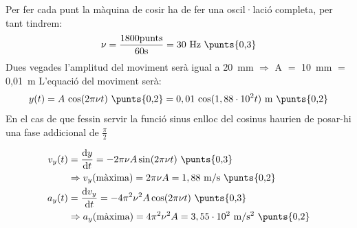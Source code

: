 \begin{solapartat}
Per fer cada punt la màquina de cosir ha de fer una oscil·lació completa, per tant tindrem:
\[ \nu = \frac{1800\text{punts}}{60\mathrm{s}} = 30\ \mathrm{Hz} \ \text{\punts{0,3}} \]
Dues vegades l'amplitud del moviment serà igual a 20~mm $\Rightarrow$ A $=$ 10~mm $=$ 0,01~m  L'equació del moviment serà:
\[ y(t) = A\,\cos(2\pi\nu t) \ \text{\punts{0,2}} = 0,01\,\cos(1,88\cdot 10^{2}t)\ \mathrm{m} \ \text{\punts{0,2}} \]
En el cas de que fessin servir la funció sinus enlloc del cosinus haurien de posar-hi una fase addicional de $\frac{\pi}{2}$
\end{solapartat}

\begin{solapartat}
\begin{align*}
v_y(t) &= \frac{\mathrm{d}y}{\mathrm{d}t} = -2\pi\nu A\sin(2\pi\nu t) \ \text{\punts{0,3}}\\
&\Rightarrow v_y(\text{màxima}) = 2\pi\nu A = 1,88\ \mathrm{m/s} \ \text{\punts{0,2}}\\
a_y(t) &= \frac{\mathrm{d}v_y}{\mathrm{d}t} = -4\pi^2\nu^2 A\cos(2\pi\nu t) \ \text{\punts{0,3}}\\
&\Rightarrow a_y(\text{màxima}) = 4\pi^2\nu^2 A = 3,55\cdot 10^{2}\ \mathrm{m/s^2} \ \text{\punts{0,2}}
\end{align*}
\end{solapartat}
